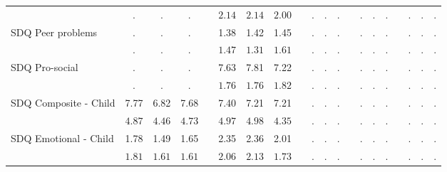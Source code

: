 \begin{center}
{\begin{longtable}{L{5cm} c c c p{.5cm} c c c p{.5cm} c c c p{.5cm} c c c p{.5cm} c c c}
& $\mathit{        .}$ & $\mathit{        .}$ & $\mathit{        .}$ & & $\mathit{     2.14}$ & $\mathit{     2.14}$ & $\mathit{     2.00}$ & & $\mathit{        .}$ & $\mathit{        .}$ & $\mathit{        .}$ & & $\mathit{        .}$ & $\mathit{        .}$ & $\mathit{        .}$ & & $\mathit{        .}$ & $\mathit{        .}$ & $\mathit{        .}$ \\[.7em]
SDQ Peer problems & . &         . &         . & &      1.38 &      1.42 &      1.45 & &         . &         . &         . & &         . &         . &         . & &         . &         . &         . \\*
& $\mathit{        .}$ & $\mathit{        .}$ & $\mathit{        .}$ & & $\mathit{     1.47}$ & $\mathit{     1.31}$ & $\mathit{     1.61}$ & & $\mathit{        .}$ & $\mathit{        .}$ & $\mathit{        .}$ & & $\mathit{        .}$ & $\mathit{        .}$ & $\mathit{        .}$ & & $\mathit{        .}$ & $\mathit{        .}$ & $\mathit{        .}$ \\[.7em]
SDQ Pro-social & . &         . &         . & &      7.63 &      7.81 &      7.22 & &         . &         . &         . & &         . &         . &         . & &         . &         . &         . \\*
& $\mathit{        .}$ & $\mathit{        .}$ & $\mathit{        .}$ & & $\mathit{     1.76}$ & $\mathit{     1.76}$ & $\mathit{     1.82}$ & & $\mathit{        .}$ & $\mathit{        .}$ & $\mathit{        .}$ & & $\mathit{        .}$ & $\mathit{        .}$ & $\mathit{        .}$ & & $\mathit{        .}$ & $\mathit{        .}$ & $\mathit{        .}$ \\[.7em]
SDQ Composite - Child & 7.77 &      6.82 &      7.68 & &      7.40 &      7.21 &      7.21 & &         . &         . &         . & &         . &         . &         . & &         . &         . &         . \\*
& $\mathit{     4.87}$ & $\mathit{     4.46}$ & $\mathit{     4.73}$ & & $\mathit{     4.97}$ & $\mathit{     4.98}$ & $\mathit{     4.35}$ & & $\mathit{        .}$ & $\mathit{        .}$ & $\mathit{        .}$ & & $\mathit{        .}$ & $\mathit{        .}$ & $\mathit{        .}$ & & $\mathit{        .}$ & $\mathit{        .}$ & $\mathit{        .}$ \\[.7em]
SDQ Emotional - Child & 1.78 &      1.49 &      1.65 & &      2.35 &      2.36 &      2.01 & &         . &         . &         . & &         . &         . &         . & &         . &         . &         . \\*
& $\mathit{     1.81}$ & $\mathit{     1.61}$ & $\mathit{     1.61}$ & & $\mathit{     2.06}$ & $\mathit{     2.13}$ & $\mathit{     1.73}$ & & $\mathit{        .}$ & $\mathit{        .}$ & $\mathit{        .}$ & & $\mathit{        .}$ & $\mathit{        .}$ & $\mathit{        .}$ & & $\mathit{        .}$ & $\mathit{        .}$ & $\mathit{        .}$ \\[.7em]

\end{longtable}}
\end{center}
